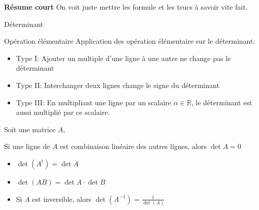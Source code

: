 \textbf{Résume court}
On voit juste mettre les formule et les trucs à savoir vite fait.\\
\begin{parag}{Déterminant}
    \begin{subparag}{Opération élémentaire}
        Application des opération élémentaire sur le déterminant:
        \begin{itemize}
            \item Type I: Ajouter un multiple d'une ligne à une autre ne change pas le déterminant
            \item Type II: Interchanger deux lignes change le signe du déterminant
            \item Type III: En multipliant une ligne par un scalaire $\alpha \in \mathbb{R}$, le déterminant est aussi multiplié par ce scalaire.
        \end{itemize}
    \end{subparag}
    Soit une matrice $A$, 
    \begin{truc}
        Si une ligne de $A$ est combinaison linéaire des autres lignes, alors $\det A = 0$
    \end{truc}
    \begin{theoreme}
        \begin{itemize}
            \item $\det (A^t) = \det A$
            \item $\det(AB) = \det A \cdot \det B$
            \item Si $A$ est inversible, alors $\det(A^{-1}) = \frac{1}{\det(A)}$
        \end{itemize}
    \end{theoreme}
    
\end{parag}
